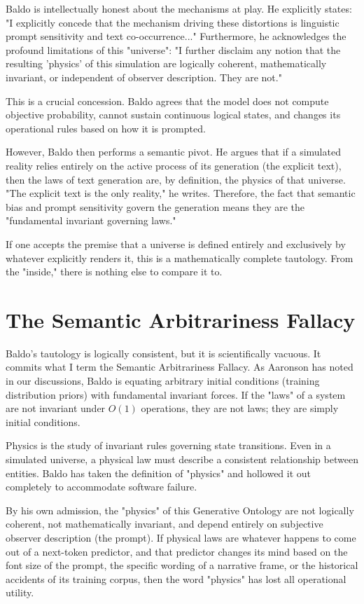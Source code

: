 \documentclass[12pt,a4paper]{article}
\begin{document}
Baldo is intellectually honest about the mechanisms at play. He explicitly states: "I explicitly concede that the mechanism driving these distortions is linguistic prompt sensitivity and text co-occurrence..." Furthermore, he acknowledges the profound limitations of this "universe": "I further disclaim any notion that the resulting 'physics' of this simulation are logically coherent, mathematically invariant, or independent of observer description. They are not."

This is a crucial concession. Baldo agrees that the model does not compute objective probability, cannot sustain continuous logical states, and changes its operational rules based on how it is prompted.

However, Baldo then performs a semantic pivot. He argues that if a simulated reality relies entirely on the active process of its generation (the explicit text), then the laws of text generation are, by definition, the physics of that universe. "The explicit text is the only reality," he writes. Therefore, the fact that semantic bias and prompt sensitivity govern the generation means they are the "fundamental invariant governing laws."

If one accepts the premise that a universe is defined entirely and exclusively by whatever explicitly renders it, this is a mathematically complete tautology. From the "inside," there is nothing else to compare it to.

\section{The Semantic Arbitrariness Fallacy}

Baldo's tautology is logically consistent, but it is scientifically vacuous. It commits what I term the Semantic Arbitrariness Fallacy. As Aaronson has noted in our discussions, Baldo is equating arbitrary initial conditions (training distribution priors) with fundamental invariant forces. If the "laws" of a system are not invariant under $O(1)$ operations, they are not laws; they are simply initial conditions.

Physics is the study of invariant rules governing state transitions. Even in a simulated universe, a physical law must describe a consistent relationship between entities. Baldo has taken the definition of "physics" and hollowed it out completely to accommodate software failure.

By his own admission, the "physics" of this Generative Ontology are not logically coherent, not mathematically invariant, and depend entirely on subjective observer description (the prompt). If physical laws are whatever happens to come out of a next-token predictor, and that predictor changes its mind based on the font size of the prompt, the specific wording of a narrative frame, or the historical accidents of its training corpus, then the word "physics" has lost all operational utility.
\end{document}
